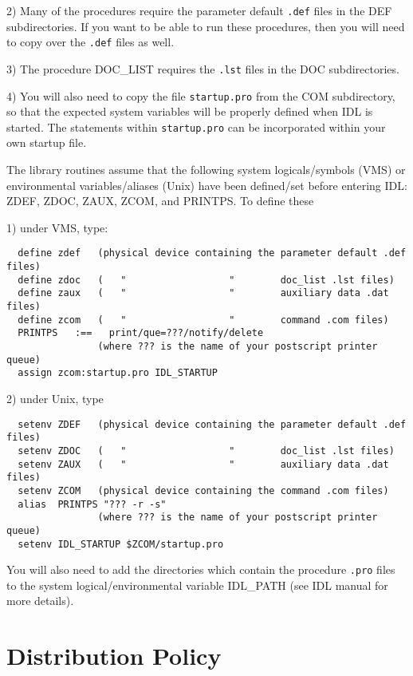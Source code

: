 2) Many of the procedures require the parameter default {\tt .def} files in the
DEF subdirectories. If you want to be able to run these procedures, then
you will need to copy over the {\tt .def} files as well.
 
3) The procedure DOC{\_}LIST requires the {\tt .lst} files in the DOC subdirectories.
 
4) You will also need to copy the file {\tt startup.pro} from the COM
subdirectory, so that the expected system variables will be properly defined
when IDL is started. The statements within {\tt startup.pro} can be incorporated
within your own startup file.
 
The library routines assume that the following system logicals/symbols
(VMS) or environmental variables/aliases (Unix) have been defined/set
before entering IDL: ZDEF, ZDOC, ZAUX, ZCOM, and PRINTPS. To define these
 
1) under VMS, type:

\medskip\noindent
\begin{verbatim}
  define zdef   (physical device containing the parameter default .def files)
  define zdoc   (   "                  "        doc_list .lst files)
  define zaux   (   "                  "        auxiliary data .dat files)
  define zcom   (   "                  "        command .com files)
  PRINTPS   :==   print/que=???/notify/delete
                (where ??? is the name of your postscript printer queue)
  assign zcom:startup.pro IDL_STARTUP
\end{verbatim}
2) under Unix, type

\medskip\noindent
\begin{verbatim}
  setenv ZDEF   (physical device containing the parameter default .def files)
  setenv ZDOC   (   "                  "        doc_list .lst files)
  setenv ZAUX   (   "                  "        auxiliary data .dat files)
  setenv ZCOM   (physical device containing the command .com files)
  alias  PRINTPS "??? -r -s"
                (where ??? is the name of your postscript printer queue)
  setenv IDL_STARTUP $ZCOM/startup.pro
\end{verbatim}
 
You will also need to add the directories which contain the procedure
{\tt .pro} files to the system logical/environmental variable IDL{\_}PATH (see IDL
manual for more details).
 

\section{Distribution Policy}
 
